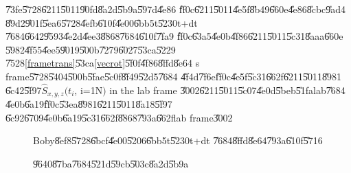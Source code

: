 \documentclass[12pt]{article}
\begin{document}
\U{73fe}\U{5728}\U{6211}\U{5011}\U{90fd}\U{8a2d}\U{5b9a}\U{597d}\U{4e86}%
\U{ff0c}\U{6211}\U{5011}\U{4e5f}\U{8b49}\U{660e}\U{4e86}\U{8cbc}\U{9ad4}%
\U{89d2}\U{901f}\U{5ea6}\U{5728}\U{4efb}\U{610f}\U{4e00}\U{6bb5}t\U{5230}t+dt%
\U{7684}\U{6642}\U{9593}\U{4e2d}\U{4ee3}\U{8868}\U{7684}\U{610f}\U{7fa9}%
\U{ff0c}\U{63a5}\U{4e0b}\U{4f86}\U{6211}\U{5011}\U{5c31}\U{8aaa}\U{660e}%
\U{5982}\U{4f55}\U{4ee5}\U{9019}\U{500b}\U{7279}\U{6027}\U{53ca}\U{5229}%
\U{7528}\ref{frametrans}\U{53ca}\ref{vecrot}\U{5f0f}\U{4f86}\U{8ffd}\U{8e64}%
s frame\U{5728}\U{5404}\U{500b}\U{5fae}\U{5c0f}\U{8f49}\U{52d5}\U{7684}%
\U{4f4d}\U{7f6e}\U{ff0c}\U{4e5f}\U{5c31}\U{662f}\U{6211}\U{5011}\U{8981}%
\U{6c42}\U{5f97}$\hat{S}_{x,y,z}(t_{i}$, i=1N$)$ in the lab frame%
\U{3002}\bigskip \U{6211}\U{5011}\U{5c07}\U{4e0d}\U{5beb}\U{51fa}lab\U{7684}%
\U{4e0b}\U{6a19}\U{ff0c}\U{53ea}\U{8981}\U{6211}\U{5011}\U{8a18}\U{5f97}%
\U{6c92}\U{6709}\U{4e0b}\U{6a19}\U{5c31}\U{662f}\U{8868}\U{793a}\U{662f}lab
frame\U{3002}

\begin{figure}[th]
\caption{Boby\U{8ef8}\U{5728}\U{6bcf}\U{4e00}\U{5206}\U{6bb5}t\U{5230}t+dt%
\U{7684}\U{8ffd}\U{8e64}\U{793a}\U{610f}\U{5716}}
\begin{center}
\end{center}
\end{figure}

\begin{figure}[th]
\caption{\U{9640}\U{87ba}\U{7684}\U{521d}\U{59cb}\U{503c}\U{8a2d}\U{5b9a}}
\begin{center}
\end{center}
\end{figure}
\end{document}
